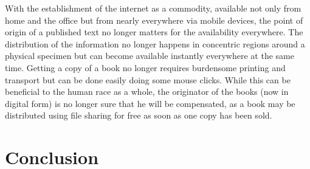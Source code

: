\documentclass[a4paper]{report}
\begin{document}
With the establishment of the internet as a commodity, available not only from home and the office but from nearly everywhere via mobile devices, the point of origin of a published text no longer matters for the availability everywhere. The distribution of the information no longer happens in concentric regions around a physical specimen but can become available instantly everywhere at the same time. Getting a copy of a book no longer requires burdensome printing and transport but can be done easily doing some mouse clicks. While this can be beneficial to the human race as a whole, the originator of the books (now in digital form) is no longer sure that he will be compensated, as a book may be distributed using file sharing for free as soon as one copy has been sold.



\chapter{Conclusion}

\newpage

\printbibliography
\end{document}
